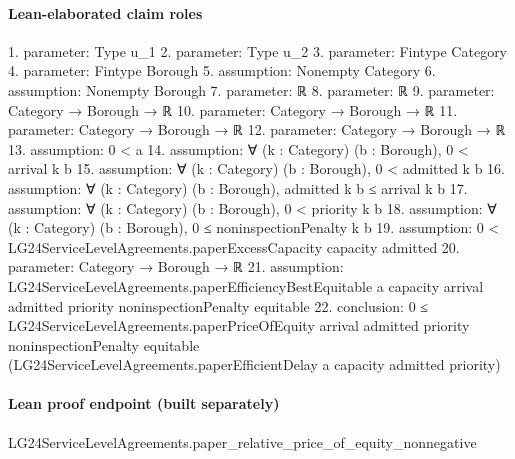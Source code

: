 \documentclass[10pt]{article}
\begin{document}
\paragraph{Lean-elaborated claim roles}\begin{ReviewVerbatim}
1. parameter: Type u_1
2. parameter: Type u_2
3. parameter: Fintype Category
4. parameter: Fintype Borough
5. assumption: Nonempty Category
6. assumption: Nonempty Borough
7. parameter: ℝ
8. parameter: ℝ
9. parameter: Category → Borough → ℝ
10. parameter: Category → Borough → ℝ
11. parameter: Category → Borough → ℝ
12. parameter: Category → Borough → ℝ
13. assumption: 0 < a
14. assumption: ∀ (k : Category) (b : Borough), 0 < arrival k b
15. assumption: ∀ (k : Category) (b : Borough), 0 < admitted k b
16. assumption: ∀ (k : Category) (b : Borough), admitted k b ≤ arrival k b
17. assumption: ∀ (k : Category) (b : Borough), 0 < priority k b
18. assumption: ∀ (k : Category) (b : Borough), 0 ≤ noninspectionPenalty k b
19. assumption: 0 < LG24ServiceLevelAgreements.paperExcessCapacity capacity admitted
20. parameter: Category → Borough → ℝ
21. assumption: LG24ServiceLevelAgreements.paperEfficiencyBestEquitable a capacity arrival admitted priority noninspectionPenalty
  equitable
22. conclusion: 0 ≤
  LG24ServiceLevelAgreements.paperPriceOfEquity arrival admitted priority noninspectionPenalty equitable
    (LG24ServiceLevelAgreements.paperEfficientDelay a capacity admitted priority)
\end{ReviewVerbatim}

\paragraph{Lean proof endpoint (built separately)}\begin{ReviewVerbatim}
LG24ServiceLevelAgreements.paper_relative_price_of_equity_nonnegative
\end{ReviewVerbatim}
\end{document}
